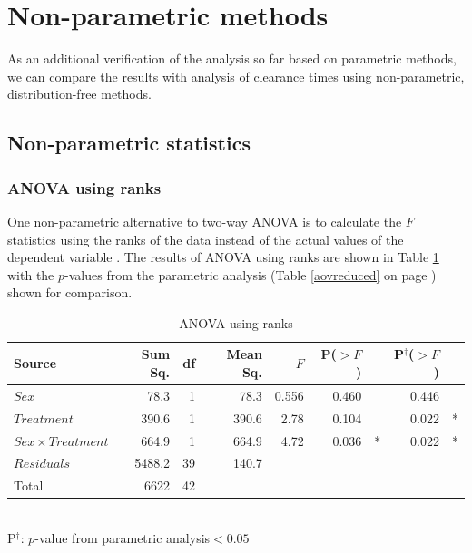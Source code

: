 \clearpage
\section{Non-parametric methods}
As an additional verification of the analysis so far based on parametric methods, we can compare the results with analysis of clearance times using non-parametric, distribution-free methods.

\subsection{Non-parametric statistics}
\subsubsection*{ANOVA using ranks}
One non-parametric alternative to two-way ANOVA is to calculate the $F$ statistics using the ranks of the data instead of the actual values of the dependent variable \cite{conover}. The results of ANOVA using ranks are shown in Table \ref{aovranks} with the $p$-values from the parametric analysis (Table \ref{aovreduced} on page \pageref{aovreduced}) shown for comparison.
\begin{table}[h]
\centering
\caption{ANOVA using ranks}\label{aovranks}
\begin{tabular}{l|rrrrrl|rl}
Source&Sum Sq.&df&Mean Sq.&$F$&P($>F$)&&P$^{\dag}$($>F$)\\
\hline
$Sex$				& 78.3 & 1 & 78.3 & 0.556 &  0.460 && 0.446& \\
$Treatment$			& 390.6   & 1 & 390.6   & 2.78 & 0.104&  & 0.022&* \\
$Sex\times Treatment$	& 664.9   & 1 & 664.9   & 4.72 & 0.036&*   & 0.022&* \\
$Residuals$			& 5488.2 & 39 & 140.7 &&&&\\
\hline
Total&6622&42&&&&
\end{tabular}\\
P$^{\dag}$: $p$-value from parametric analysis\qquad*$<0.05$
\end{table}

